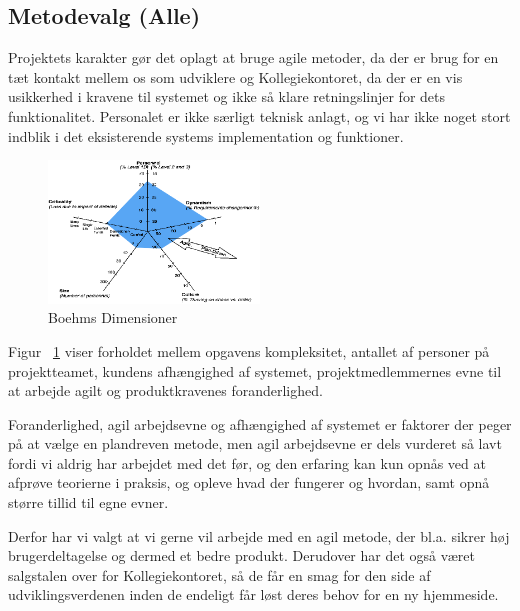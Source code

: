 \documentclass[12pt, a4paper]{report}
\begin{document}
\subsection{Metodevalg (Alle)}

Projektets karakter gør det oplagt at bruge agile metoder, da der er brug for en tæt kontakt mellem os som udviklere og Kollegiekontoret, da der er en vis usikkerhed i kravene til systemet og ikke så klare retningslinjer for dets funktionalitet. Personalet er ikke særligt teknisk anlagt, og vi har ikke noget stort indblik i det eksisterende systems implementation og funktioner.

\begin{figure}[ht]

\centering

\includegraphics[width=0.5\textwidth]{amoebe}

\caption{Boehms Dimensioner}

\label{amoeb}

\end{figure}

Figur ~\ref{amoeb} viser forholdet mellem opgavens kompleksitet, antallet af personer på projektteamet, kundens afhængighed af systemet, projektmedlemmernes evne til at arbejde agilt og produktkravenes foranderlighed.

Foranderlighed, agil arbejdsevne og afhængighed af systemet er faktorer der peger på at vælge en plandreven metode, men agil arbejdsevne er dels vurderet så lavt fordi vi aldrig har arbejdet med det før, og den erfaring kan kun opnås ved at afprøve teorierne i praksis, og opleve hvad der fungerer og hvordan, samt opnå større tillid til egne evner.

Derfor har vi valgt at vi gerne vil arbejde med en agil metode, der bl.a. sikrer høj brugerdeltagelse og dermed et bedre produkt. Derudover har det også været salgstalen over for Kollegiekontoret, så de får en smag for den side af udviklingsverdenen inden de endeligt får løst deres behov for en ny hjemmeside.
\end{document}
